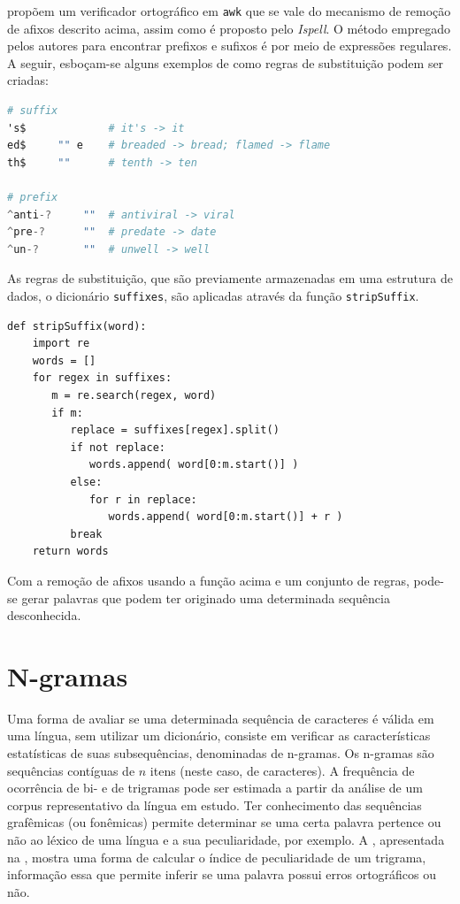 \documentclass{textolivre}
\begin{document}
\textcite{robbins2005} propõem um verificador ortográfico em \texttt{awk}
que se vale do mecanismo
de remoção de afixos descrito acima,
assim 
como é proposto pelo \textit{Ispell}. 
O método empregado pelos autores para
encontrar prefixos e sufixos é
por meio de expressões regulares.
A seguir, esboçam-se alguns exemplos de como 
regras de substituição podem ser criadas:
\begin{lstlisting}[language=awk,label=lst-regex-ex]
# suffix
's$             # it's -> it
ed$     "" e    # breaded -> bread; flamed -> flame
th$     ""      # tenth -> ten

# prefix
^anti-?     ""  # antiviral -> viral
^pre-?      ""  # predate -> date
^un-?       ""  # unwell -> well
\end{lstlisting}%
As regras de substituição, que são previamente armazenadas em uma estrutura de dados,
o dicionário \texttt{suffixes}, são aplicadas através da função \texttt{stripSuffix}.
\begin{lstlisting}[label=lst-stripsuffix]
def stripSuffix(word):
    import re
    words = []
    for regex in suffixes:
       m = re.search(regex, word)
       if m:
          replace = suffixes[regex].split()
          if not replace:
             words.append( word[0:m.start()] )
          else:
             for r in replace:
                words.append( word[0:m.start()] + r )
          break
    return words
\end{lstlisting}%
Com a remoção de afixos usando a função acima e um conjunto de regras, pode-se gerar palavras que podem ter originado uma
determinada sequência desconhecida.



\section{N-gramas}\label{sec-ngrams}
Uma forma de avaliar se uma determinada sequência de caracteres é 
válida em uma 
língua, sem utilizar um dicionário, consiste em verificar as características estatísticas de suas subsequências,
denominadas de n-gramas. Os n-gramas são sequências contíguas de $n$ itens (neste
caso, de caracteres). A frequência de 
ocorrência de bi- e de trigramas pode ser
estimada a partir
da análise de um corpus representativo da língua em estudo. Ter conhecimento
das
sequências grafêmicas (ou fonêmicas)
permite determinar se uma
certa palavra pertence ou não ao
léxico de uma língua e a sua
peculiaridade, por exemplo. A
, apresentada na
, mostra uma forma de calcular o índice de peculiaridade de um trigrama, informação essa que
permite inferir se uma
palavra possui erros ortográficos ou não.
\end{document}
